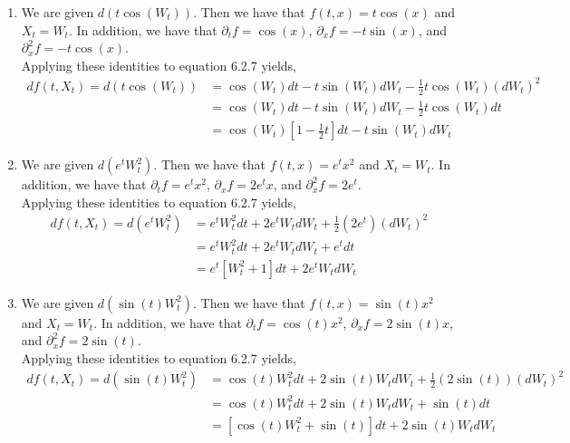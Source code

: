 \documentclass[12pt]{article}
\newenvironment{problem}[2][Problem]{\begin{trivlist}
\item[\hskip \labelsep {\bfseries #1}\hskip \labelsep {\bfseries #2.}]}{\end{trivlist}}
\begin{document}
\begin{problem}{20}
\end{problem}

\begin{enumerate}[\alph*)]
\item We are given $d(t\cos(W_t))$. Then we have that $f(t,x) = t\cos(x)$ and $X_t = W_t$. In addition, we have that $\partial_t f = \cos(x)$, $\partial_x f = -t\sin(x)$, and $\partial^2_x f = -t\cos(x)$.\\

Applying these identities to equation 6.2.7 yields,
\begin{align*}
df(t, X_t) = d(t\cos(W_t)) &= \cos(W_t)dt - t\sin(W_t)dW_t - \frac{1}{2}t\cos(W_t)(dW_t)^2\\
&= \cos(W_t)dt - t\sin(W_t)dW_t - \frac{1}{2}t\cos(W_t)dt\\
&= \cos(W_t)\left[1 - \frac{1}{2}t\right]dt - t\sin(W_t)dW_t
\end{align*}

\item We are given $d(e^tW_t^2)$. Then we have that $f(t,x) = e^tx^2$ and $X_t = W_t$. In addition, we have that $\partial_t f = e^tx^2$, $\partial_x f = 2e^tx$, and $\partial^2_x f = 2e^t$.\\

Applying these identities to equation 6.2.7 yields,
\begin{align*}
df(t, X_t) = d(e^tW_t^2) &= e^tW_t^2dt + 2e^tW_tdW_t + \frac{1}{2}(2e^t)(dW_t)^2\\
&= e^tW_t^2dt + 2e^tW_tdW_t + e^t dt\\
&= e^t\left[W_t^2 + 1\right]dt + 2e^tW_tdW_t
\end{align*}

\item We are given $d(\sin(t)W_t^2)$. Then we have that $f(t,x) = \sin(t)x^2$ and $X_t = W_t$. In addition, we have that $\partial_t f = \cos(t)x^2$, $\partial_x f = 2\sin(t)x$, and $\partial^2_x f = 2\sin(t)$.\\

Applying these identities to equation 6.2.7 yields,
\begin{align*}
df(t, X_t) = d(\sin(t)W_t^2) &= \cos(t)W_t^2dt + 2\sin(t)W_tdW_t + \frac{1}{2}(2\sin(t))(dW_t)^2\\
&= \cos(t)W_t^2dt + 2\sin(t)W_tdW_t + \sin(t)dt\\
&= \left[\cos(t)W_t^2 + \sin(t)\right]dt + 2\sin(t)W_tdW_t
\end{align*}
\end{enumerate}
\end{document}
